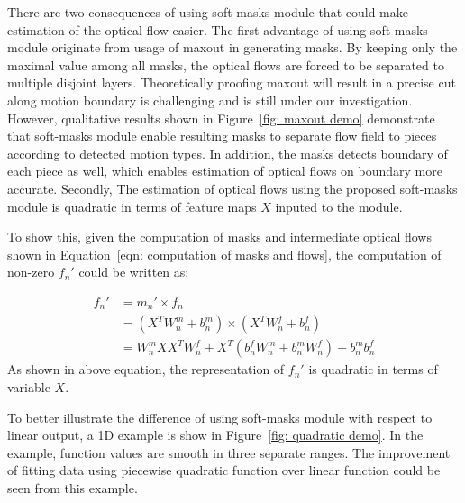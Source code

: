 \documentclass[10pt,twocolumn,letterpaper]{article}
\begin{document}
There are two consequences of using soft-masks module that could make estimation of the optical flow easier. The first advantage of using soft-masks module originate from usage of maxout in generating masks. By keeping only the maximal value among all masks, the optical flows are forced to be separated to multiple disjoint layers. Theoretically proofing maxout will result in a precise cut along motion boundary is challenging and is still under our investigation. However, qualitative results shown in Figure~\ref{fig: maxout demo} demonstrate that soft-masks module enable resulting masks to separate flow field to pieces according to detected motion types. In addition, the masks detects boundary of each piece as well, which enables estimation of optical flows on boundary more accurate.  Secondly, The estimation of optical flows using the proposed soft-masks module is quadratic in terms of feature maps $X$ inputed to the module.

To show this, given the computation of masks and intermediate optical flows shown in Equation~\ref{eqn: computation of masks and flows}, the computation of non-zero $f_n'$ could be written as:

\begin{align}
f_n' & = m_n' \times f_n \nonumber\\
	 & = (X^T W_n^m + b_n^m) \times (X^T W_n^f + b_n^f) \nonumber\\
	 & = W_n^m X X^T W_n^f + X^T(b_n^f W_n^m + b_n^m W_n^f) + b_n^m b_n^f
\end{align}
As shown in above equation, the representation of $f_n'$ is quadratic in terms of variable $X$.

To better illustrate the difference of using soft-masks module with respect to linear output, a 1D example is show in Figure~\ref{fig: quadratic demo}. In the example, function values are smooth in three separate ranges. The improvement of fitting data using piecewise quadratic function over linear function could be seen from this example. 
\end{document}

